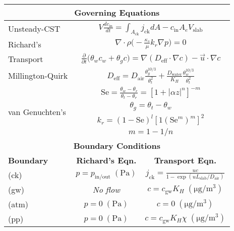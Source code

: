 \documentclass[preprint,12pt]{elsarticle}
\begin{document}
\clearpage
\begin{table}
  \centering
  \begin{tabular}{l c c c c c c}
    \toprule
    \multicolumn{7}{c}{\textbf{Governing Equations}} \\
    \midrule
    Unsteady-CST & \multicolumn{6}{c}{$V\frac{d c_\mathrm{in}}{d t} = \int_{A_\mathrm{ck}} j_\mathrm{ck} dA - c_\mathrm{in} A_e V_\mathrm{slab}$} \\
    Richard's & \multicolumn{6}{c}{$\nabla \cdot \rho \Big( - \frac{\kappa_s}{\mu} k_r \nabla p \Big) = 0$} \\
    Transport & \multicolumn{6}{c}{$\frac{\partial}{\partial t} \Big( \theta_w c_w + \theta_g c \Big) = \nabla (D_\mathrm{eff} \cdot \nabla c) - \vec{u} \cdot \nabla c$} \\
    Millington-Quirk & \multicolumn{6}{c}{$D_\mathrm{eff} = D_\mathrm{air}\frac{\theta_g^{10/3}}{\theta_t^2} + \frac{D_\mathrm{water}}{K_H} \frac{\theta_w^{10/3}}{\theta_t^2}$} \\
    \multirow{4}{*}{van Genuchten's} & \multicolumn{6}{c}{$\mathrm{Se} = \frac{\theta_w - \theta_r}{\theta_t - \theta_r} = [1 + |\alpha z|^n]^{-m}$} \\
     & \multicolumn{6}{c}{$\theta_g = \theta_t - \theta_w$}\\
     & \multicolumn{6}{c}{$k_r = (1-\mathrm{Se})^{l}[1(\mathrm{Se}^{m})^m]^2$} \\
     & \multicolumn{6}{c}{$m = 1 - 1/n$} \\
    \midrule
    \multicolumn{7}{c}{\textbf{Boundary Conditions}} \\
    \midrule
    \textbf{Boundary} & \multicolumn{3}{c}{\textbf{Richard's Eqn.}} & \multicolumn{3}{c}{\textbf{Transport Eqn.}} \\
    (ck) & \multicolumn{3}{c}{$p = p_\mathrm{in/out} \; \mathrm{(Pa)}$} & \multicolumn{3}{c}{$j_\mathrm{ck} = \frac{u c}{1 - \exp{(u L_\mathrm{slab}/D_\mathrm{air})}}$} \\
    (gw) & \multicolumn{3}{c}{\textit{No flow}} & \multicolumn{3}{c}{$c = c_\mathrm{gw} K_H \; \mathrm{(\mu g/m^3)}$} \\
    (atm) & \multicolumn{3}{c}{$p = 0 \; \mathrm{(Pa)}$} & \multicolumn{3}{c}{$c = 0 \; \mathrm{(\mu g/m^3)}$} \\
    (pp) & \multicolumn{3}{c}{$p = 0 \; \mathrm{(Pa)}$} & \multicolumn{3}{c}{$c = c_\mathrm{gw} K_H \chi \; \mathrm{(\mu g/m^3)}$} \\

\end{tabular}
\end{table}
\end{document}
